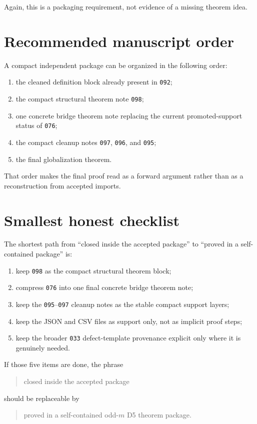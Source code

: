 \documentclass[11pt]{article}
\begin{document}
Again, this is a packaging requirement, not evidence of a missing theorem idea.

\section{Recommended manuscript order}

A compact independent package can be organized in the following order:
\begin{enumerate}[label=\textup{\arabic*.},leftmargin=2.2em]
\item the cleaned definition block already present in \texttt{092};
\item the compact structural theorem note \texttt{098};
\item one concrete bridge theorem note replacing the current promoted-support
status of \texttt{076};
\item the compact cleanup notes \texttt{097}, \texttt{096}, and \texttt{095};
\item the final globalization theorem.
\end{enumerate}

That order makes the final proof read as a forward argument rather than as a
reconstruction from accepted imports.

\section{Smallest honest checklist}

The shortest path from ``closed inside the accepted package'' to ``proved in a
self-contained package'' is:
\begin{enumerate}[label=\textup{\arabic*.},leftmargin=2.2em]
\item keep \texttt{098} as the compact structural theorem block;
\item compress \texttt{076} into one final concrete bridge theorem note;
\item keep the \texttt{095}--\texttt{097} cleanup notes as the stable compact
support layers;
\item keep the JSON and CSV files as support only, not as implicit proof steps;
\item keep the broader \texttt{033} defect-template provenance explicit only
where it is genuinely needed.
\end{enumerate}

If those five items are done, the phrase
\begin{quote}
closed inside the accepted package
\end{quote}
should be replaceable by
\begin{quote}
proved in a self-contained odd-$m$ D5 theorem package.
\end{quote}
\end{document}
